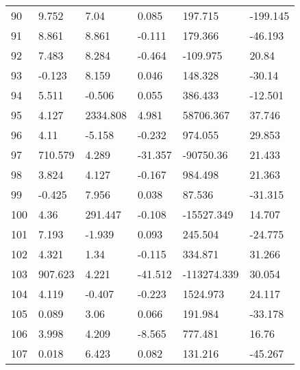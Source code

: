 \documentclass[11pt]{article}
\begin{document}
\begin{center}
\begin{longtable}{llllll}
        90  & 9.752      & 7.04                   & 0.085             & 197.715            & -199.145 \\
        91  & 8.861      & 8.861                  & -0.111            & 179.366            & -46.193  \\
        92  & 7.483      & 8.284                  & -0.464            & -109.975           & 20.84    \\
        93  & -0.123     & 8.159                  & 0.046             & 148.328            & -30.14   \\
        94  & 5.511      & -0.506                 & 0.055             & 386.433            & -12.501  \\
        95  & 4.127      & 2334.808               & 4.981             & 58706.367          & 37.746   \\
        96  & 4.11       & -5.158                 & -0.232            & 974.055            & 29.853   \\
        97  & 710.579    & 4.289                  & -31.357           & -90750.36          & 21.433   \\
        98  & 3.824      & 4.127                  & -0.167            & 984.498            & 21.363   \\
        99  & -0.425     & 7.956                  & 0.038             & 87.536             & -31.315  \\
        100 & 4.36       & 291.447                & -0.108            & -15527.349         & 14.707   \\
        101 & 7.193      & -1.939                 & 0.093             & 245.504            & -24.775  \\
        102 & 4.321      & 1.34                   & -0.115            & 334.871            & 31.266   \\
        103 & 907.623    & 4.221                  & -41.512           & -113274.339        & 30.054   \\
        104 & 4.119      & -0.407                 & -0.223            & 1524.973           & 24.117   \\
        105 & 0.089      & 3.06                   & 0.066             & 191.984            & -33.178  \\
        106 & 3.998      & 4.209                  & -8.565            & 777.481            & 16.76    \\
        107 & 0.018      & 6.423                  & 0.082             & 131.216            & -45.267  \\

\end{longtable}
\end{center}
\end{document}
